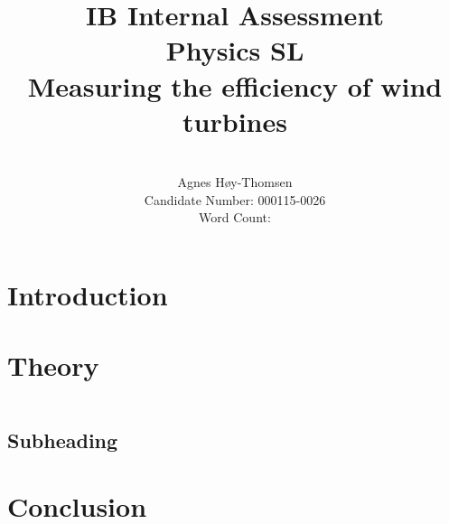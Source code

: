 \documentclass[12pt]{article}
\title{\textbf{IB Internal Assessment}\\\textbf{Physics SL}\\ \vspace{5cm}Measuring the efficiency of wind turbines}
\author{\vspace{5cm}\\Agnes H\o y-Thomsen\\Candidate Number: 000115-0026\\Word Count: }
\begin{document}
\maketitle
\clearpage
\vspace{5cm}
\tableofcontents
\newpage

\section{Introduction} 
\section{Theory}
\begin{equation}

\label{WRITE A UNIQUE NAME HERE}
\end{equation} 
\subsection{Subheading}
\section{Conclusion}



\nocite{*}
\newpage






\end{document}
